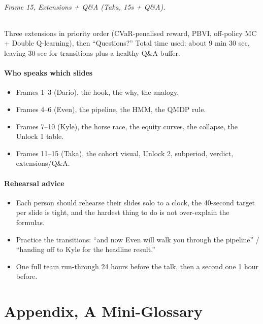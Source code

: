 \documentclass[11pt]{article}
\begin{document}
\paragraph{Frame 15, Extensions + Q\&A (Taka, 15s + Q\&A).} Three extensions in priority order (CVaR-penalised reward, PBVI, off-policy MC + Double Q-learning), then ``Questions?'' Total time used: about 9 min 30 sec, leaving 30 sec for transitions plus a healthy Q\&A buffer.

\subsection{Who speaks which slides}

\begin{itemize}
  \item Frames 1--3 (Dario), the hook, the why, the analogy.
  \item Frames 4--6 (Even), the pipeline, the HMM, the QMDP rule.
  \item Frames 7--10 (Kyle), the horse race, the equity curves, the collapse, the Unlock 1 table.
  \item Frames 11--15 (Taka), the cohort visual, Unlock 2, subperiod, verdict, extensions/Q\&A.
\end{itemize}

\subsection{Rehearsal advice}

\begin{itemize}
  \item Each person should rehearse their slides solo to a clock, the 40-second target per slide is tight, and the hardest thing to do is not over-explain the formulas.
  \item Practice the transitions: ``and now Even will walk you through the pipeline'' / ``handing off to Kyle for the headline result.''
  \item One full team run-through 24 hours before the talk, then a second one 1 hour before.
\end{itemize}

\part{Appendix, A Mini-Glossary}
\end{document}
